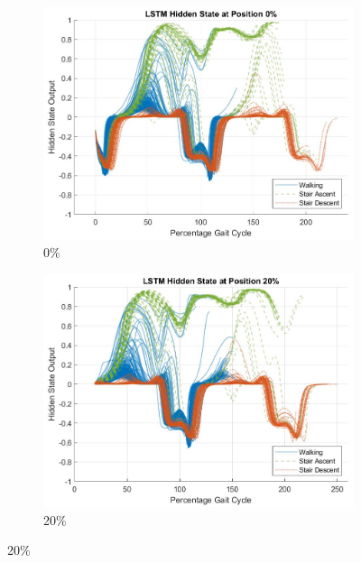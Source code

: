 \documentclass[sensors,article,submit,moreauthors,pdftex]{Definitions/mdpi}
\begin{document}
\begin{figure}[!hbt]
     \centering
     \begin{subfigure}[b]{0.32\textwidth}
         \centering
         \includegraphics[width=\textwidth]{Figures/results/hidden_state/gyro_y_w_v_sa-sd/0_Participant_04.jpg}
         \caption{0\%}
         \label{subfig:gyro_y_w_v_sa_sd_0}
     \end{subfigure}
     \hfill
     \begin{subfigure}[b]{0.32\textwidth}
         \centering
         \includegraphics[width=\textwidth]{Figures/results/hidden_state/gyro_y_w_v_sa-sd/20_Participant_04.jpg}
         \caption{20\%}
         \label{subfig:gyro_y_w_v_sa_sd_20}
     \end{subfigure}

\end{figure}
\end{document}
